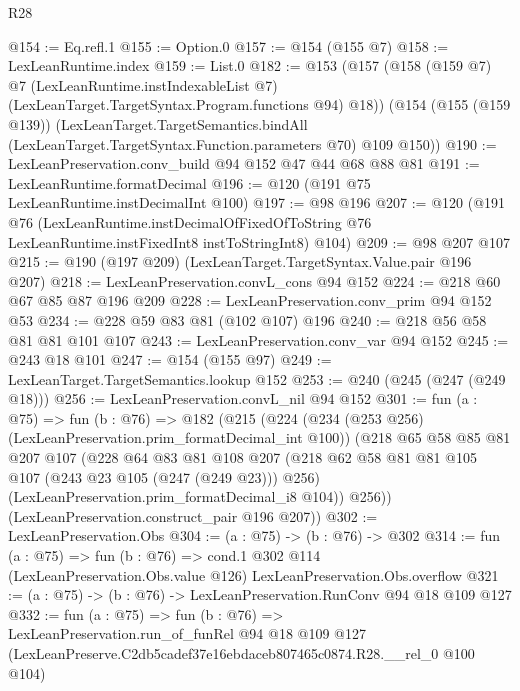 \begin{lexlean}{R28}
\begin{coremodule}
@154 := Eq.refl.{1}
@155 := Option.{0}
@157 := @154 (@155 @7)
@158 := LexLeanRuntime.index
@159 := List.{0}
@182 := @153
    (@157
      (@158
        (@159 @7)
        @7
        (LexLeanRuntime.instIndexableList @7)
        (LexLeanTarget.TargetSyntax.Program.functions @94)
        @18))
    (@154
      (@155 (@159 @139))
      (LexLeanTarget.TargetSemantics.bindAll
        (LexLeanTarget.TargetSyntax.Function.parameters @70)
        @109
        @150))
@190 := LexLeanPreservation.conv_build @94 @152 @47 @44 @68 @88 @81
@191 := LexLeanRuntime.formatDecimal
@196 := @120 (@191 @75 LexLeanRuntime.instDecimalInt @100)
@197 := @98 @196
@207 := @120
    (@191
      @76
      (LexLeanRuntime.instDecimalOfFixedOfToString
        @76
        LexLeanRuntime.instFixedInt8
        instToStringInt8)
      @104)
@209 := @98 @207 @107
@215 := @190 (@197 @209) (LexLeanTarget.TargetSyntax.Value.pair @196 @207)
@218 := LexLeanPreservation.convL_cons @94 @152
@224 := @218 @60 @67 @85 @87 @196 @209
@228 := LexLeanPreservation.conv_prim @94 @152 @53
@234 := @228 @59 @83 @81 (@102 @107) @196
@240 := @218 @56 @58 @81 @81 @101 @107
@243 := LexLeanPreservation.conv_var @94 @152
@245 := @243 @18 @101
@247 := @154 (@155 @97)
@249 := LexLeanTarget.TargetSemantics.lookup @152
@253 := @240 (@245 (@247 (@249 @18)))
@256 := LexLeanPreservation.convL_nil @94 @152
@301 := fun (a : @75) =>
  fun (b : @76) =>
  @182
    (@215
      (@224
        (@234 (@253 @256) (LexLeanPreservation.prim_formatDecimal_int @100))
        (@218
          @65
          @58
          @85
          @81
          @207
          @107
          (@228
            @64
            @83
            @81
            @108
            @207
            (@218 @62 @58 @81 @81 @105 @107 (@243 @23 @105 (@247 (@249 @23))) @256)
            (LexLeanPreservation.prim_formatDecimal_i8 @104))
          @256))
      (LexLeanPreservation.construct_pair @196 @207))
@302 := LexLeanPreservation.Obs
@304 := (a : @75) -> (b : @76) -> @302
@314 := fun (a : @75) =>
  fun (b : @76) =>
  cond.{1} @302 @114 (LexLeanPreservation.Obs.value @126) LexLeanPreservation.Obs.overflow
@321 := (a : @75) -> (b : @76) -> LexLeanPreservation.RunConv @94 @18 @109 @127
@332 := fun (a : @75) =>
  fun (b : @76) =>
  LexLeanPreservation.run_of_funRel
    @94
    @18
    @109
    @127
    (LexLeanPreserve.C2db5cadef37e16ebdaceb807465c0874.R28.__rel_0 @100 @104)
\end{coremodule}
\end{lexlean}
